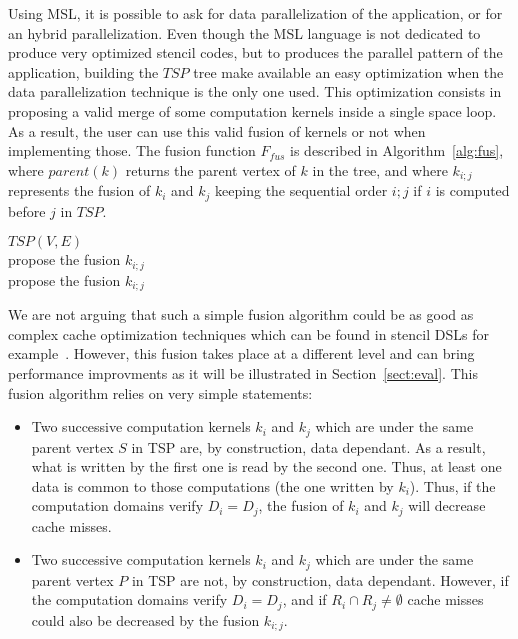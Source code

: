 Using MSL, it is possible to ask for data parallelization of the application, or for an hybrid parallelization. Even though the MSL language is not dedicated to produce very optimized stencil codes, but to produces the parallel pattern of the application, building the $TSP$ tree make available an easy optimization when the data parallelization technique is the only one used. This optimization consists in proposing a valid merge of some computation kernels inside a single space loop. As a result, the user can use this valid fusion of kernels or not when implementing those. The fusion function $F_{fus}$ is described in Algorithm~\ref{alg:fus}, where $parent(k)$ returns the parent vertex of $k$ in the tree, and where $k_{i;j}$ represents the fusion of $k_i$ and $k_j$ keeping the sequential order $i;j$ if $i$ is computed before $j$ in $TSP$.

\begin{algorithm}
\caption{$F_{fus}$}
\label{alg:fus}
\begin{algorithmic}[1]
 {$TSP(V,E)$}
\\propose the fusion $k_{i;j}$
\EndIf
\EndIf
{}
\\propose the fusion $k_{i;j}$
\EndIf
\EndIf
\EndIf
\EndIf
\EndFor
\EndProcedure
\end{algorithmic}
\end{algorithm}

We are not arguing that such a simple fusion algorithm could be as good as complex cache optimization techniques which can be found in stencil DSLs for example~\cite{spaaTangCKLL11}. However, this fusion takes place at a different level and can bring performance improvments as it will be illustrated in Section~\ref{sect:eval}. This fusion algorithm relies on very simple statements:
\begin{itemize}
\item Two successive computation kernels $k_i$ and $k_j$ which are under the same parent vertex $S$ in TSP are, by construction, data dependant. As a result, what is written by the first one is read by the second one. Thus, at least one data is common to those computations (the one written by $k_i$). Thus, if the computation domains verify $D_i=D_j$, the fusion of $k_i$ and $k_j$ will decrease cache misses.
\item Two successive computation kernels $k_i$ and $k_j$ which are under the same parent vertex $P$ in TSP are not, by construction, data dependant. However, if the computation domains verify $D_i=D_j$, and if $R_i \cap R_j \neq \emptyset$ cache misses could also be decreased by the fusion $k_{i;j}$.
\end{itemize}

